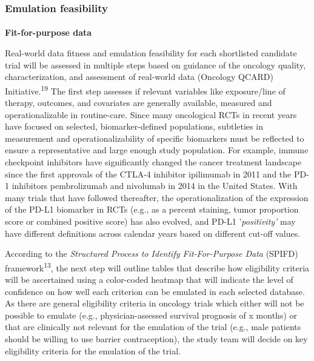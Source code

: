 \documentclass[
  letterpaper,
  DIV=11,
  numbers=noendperiod]{scrartcl}
\makeatletter
\let\oldparagraph\paragraph
\renewcommand{\paragraph}{
    \@ifstar
      \xxxParagraphStar
      \xxxParagraphNoStar
  }
\newcommand{\xxxParagraphStar}[1]{\oldparagraph*{#1}\mbox{}}
\newcommand{\xxxParagraphNoStar}[1]{\oldparagraph{#1}\mbox{}}
\makeatother
\begin{document}
\subsubsection{Emulation feasibility}\label{emulation-feasibility}

\paragraph{\texorpdfstring{\textbf{Fit-for-purpose
data}}{Fit-for-purpose data}}\label{fit-for-purpose-data}

Real-world data fitness and emulation feasibility for each shortlisted
candidate trial will be assessed in multiple steps based on guidance of
the oncology quality, characterization, and assessment of real-world
data (Oncology QCARD) Initiative.\textsuperscript{19} The first step
assesses if relevant variables like exposure/line of therapy, outcomes,
and covariates are generally available, measured and operationalizable
in routine-care. Since many oncological RCTs in recent years have
focused on selected, biomarker-defined populations, subtleties in
measurement and operationalizability of specific biomarkers must be
reflected to ensure a representative and large enough study population.
For example, immune checkpoint inhibitors have significantly changed the
cancer treatment landscape since the first approvals of the CTLA-4
inhibitor ipilimumab in 2011 and the PD-1 inhibitors pembrolizumab and
nivolumab in 2014 in the United States. With many trials that have
followed thereafter, the operationalization of the expression of the
PD-L1 biomarker in RCTs (e.g., as a percent staining, tumor proportion
score or combined positive score) has also evolved, and PD-L1
'\emph{positivity'} may have different definitions across calendar years
based on different cut-off values.

According to the \emph{Structured Process to Identify Fit-For-Purpose
Data} (SPIFD) framework\textsuperscript{13}, the next step will outline
tables that describe how eligibility criteria will be ascertained using
a color-coded heatmap that will indicate the level of confidence on how
well each criterion can be emulated in each selected database. As there
are general eligibility criteria in oncology trials which either will
not be possible to emulate (e.g., physician-assessed survival prognosis
of x months) or that are clinically not relevant for the emulation of
the trial (e.g., male patients should be willing to use barrier
contraception), the study team will decide on key eligibility criteria
for the emulation of the trial.
\end{document}
